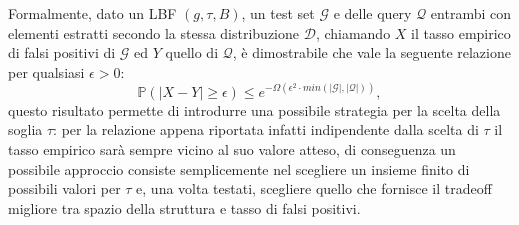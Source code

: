 \documentclass[../../main.tex]{subfiles}
\begin{document}
    Formalmente, dato un LBF $(g, \tau, B)$, un test set $\mathcal{G}$ e delle query $\mathcal{Q}$ entrambi con elementi estratti secondo la stessa distribuzione $\mathcal{D}$, chiamando $X$ il tasso empirico di falsi positivi di $\mathcal{G}$ ed $Y$ quello di $\mathcal{Q}$, è dimostrabile che vale la seguente relazione per qualsiasi $\epsilon > 0$:
    \begin{equation}
        \mathbb{P}(|X - Y| \geq \epsilon) \leq e^{-\Omega(\epsilon^2 \cdot min(|\mathcal{G}|, |\mathcal{Q}|))},
    \end{equation}
    questo risultato permette di introdurre una possibile strategia per la scelta della soglia $\tau$: per la relazione appena riportata infatti indipendente dalla scelta di $\tau$ il tasso empirico sarà sempre vicino al suo valore atteso, di conseguenza un possibile approccio consiste semplicemente nel scegliere un insieme finito di possibili valori per $\tau$ e, una volta testati, scegliere quello che fornisce il tradeoff migliore tra spazio della struttura e tasso di falsi positivi.
\end{document}
